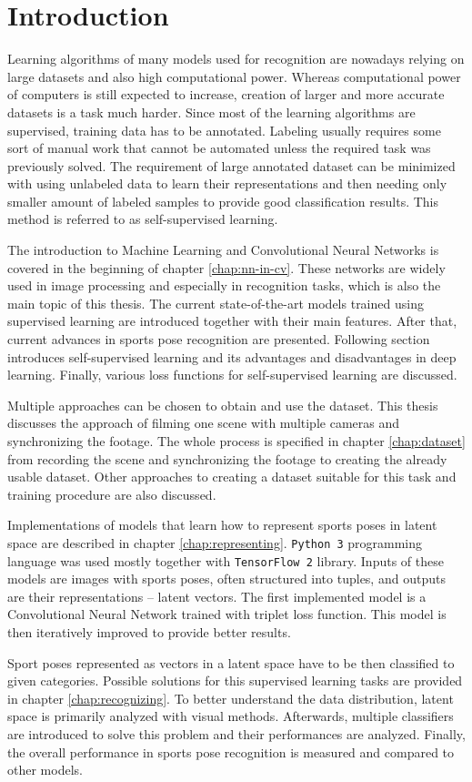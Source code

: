 \chapter{\label{chap:intro}Introduction}

Learning algorithms of many models used for recognition are nowadays relying on large datasets and also high computational power. Whereas computational power of computers is still expected to increase, creation of larger and more accurate datasets is a task much harder. Since most of the learning algorithms are supervised, training data has to be annotated. Labeling usually requires some sort of manual work that cannot be automated unless the required task was previously solved. The requirement of large annotated dataset can be minimized with using unlabeled data to learn their representations and then needing only smaller amount of labeled samples to provide good classification results. This method is referred to as self-supervised learning.

The introduction to Machine Learning and Convolutional Neural Networks is covered in the beginning of chapter \ref{chap:nn-in-cv}. These networks are widely used in image processing and especially in recognition tasks, which is also the main topic of this thesis. The current state-of-the-art models trained using supervised learning are introduced together with their main features. After that, current advances in sports pose recognition are presented. Following section introduces self-supervised learning and its advantages and disadvantages in deep learning. Finally, various loss functions for self-supervised learning are discussed.

Multiple approaches can be chosen to obtain and use the dataset. This thesis discusses the approach of filming one scene with multiple cameras and synchronizing the footage. The whole process is specified in chapter \ref{chap:dataset} from recording the scene and synchronizing the footage to creating the already usable dataset. Other approaches to creating a dataset suitable for this task and training procedure are also discussed.

Implementations of models that learn how to represent sports poses in latent space are described in chapter \ref{chap:representing}. \texttt{Python 3} programming language was used mostly together with \texttt{TensorFlow 2} library. Inputs of these models are images with sports poses, often structured into tuples, and outputs are their representations -- latent vectors. The first implemented model is a Convolutional Neural Network trained with triplet loss function. This model is then iteratively improved to provide better results.

Sport poses represented as vectors in a latent space have to be then classified to given categories. Possible solutions for this supervised learning tasks are provided in chapter \ref{chap:recognizing}. To better understand the data distribution, latent space is primarily analyzed with visual methods. Afterwards, multiple classifiers are introduced to solve this problem and their performances are analyzed. Finally, the overall performance in sports pose recognition is measured and compared to other models.